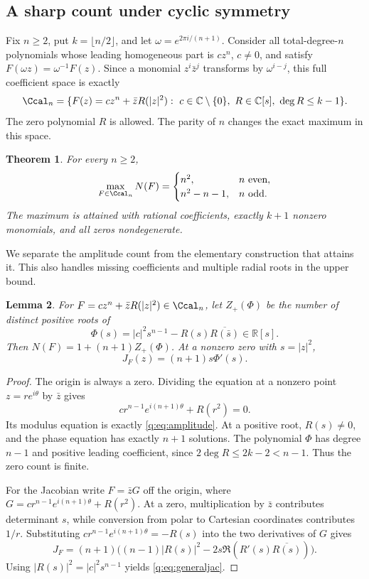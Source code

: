 \documentclass[UTF8,11pt]{ctexart}
\newtheorem{thm}{Theorem}[section]
\newtheorem{lem}[thm]{Lemma}
\theoremstyle{definition}
\numberwithin{equation}{section}
\newcommand{\C}{\mathbb C}\newcommand{\R}{\mathbb R}
\begin{document}
\subsection{A sharp count under cyclic symmetry}\label{q:sec:cyclic}
Fix $n\ge2$, put $k=\lfloor n/2\rfloor$, and let
$\omega=e^{2\pi i/(n+1)}$. Consider all total-degree-$n$ polynomials
whose leading homogeneous part is $cz^n$, $c\ne0$, and satisfy
$F(\omega z)=\omega^{-1}F(z)$. Since a monomial $z^i\bar z^j$ transforms
by $\omega^{i-j}$, this full coefficient space is exactly
\[
 \Ccal_n=\{F(z)=cz^n+\bar z R(|z|^2):\ c\in\C\setminus\{0\},\
                    R\in\C[s],\ \deg R\le k-1\}.
\]
The zero polynomial $R$ is allowed. The parity of $n$ changes the exact
maximum in this space.
\begin{thm}\label{q:thm:cyclic}
For every $n\ge2$,
\begin{equation}\label{q:eq:cyclicmaximum}
 \max_{F\in\Ccal_n}N(F)=
 \begin{cases}
 n^2,&n\text{ even},\\
 n^2-n-1,&n\text{ odd}.
 \end{cases}
\end{equation}
The maximum is attained with rational coefficients, exactly $k+1$
nonzero monomials, and all zeros nondegenerate.
\end{thm}

We separate the amplitude count from the elementary construction that
attains it. This also handles missing coefficients and multiple radial
roots in the upper bound.
\begin{lem}\label{q:lem:amplitude}
For $F=cz^n+\bar zR(|z|^2)\in\Ccal_n$, let $Z_+(\Phi)$ be the number
of distinct positive roots of
\begin{equation}\label{q:eq:amplitude}
 \Phi(s)=|c|^2s^{n-1}-R(s)\overline{R(\bar s)}\in\R[s].
\end{equation}
Then $N(F)=1+(n+1)Z_+(\Phi)$. At a nonzero zero with $s=|z|^2$,
\begin{equation}\label{q:eq:generaljac}
 J_F(z)=(n+1)s\Phi'(s).
\end{equation}
\end{lem}
\begin{proof}
The origin is always a zero. Dividing the equation at a nonzero point
$z=re^{i\theta}$ by $\bar z$ gives
\[
 c r^{n-1}e^{i(n+1)\theta}+R(r^2)=0.
\]
Its modulus equation is exactly \eqref{q:eq:amplitude}. At a positive
root, $R(s)\ne0$, and the phase equation has exactly $n+1$ solutions.
The polynomial $\Phi$ has degree $n-1$ and positive leading coefficient,
since $2\deg R\le2k-2<n-1$. Thus the zero count is finite.

For the Jacobian write $F=\bar zG$ off the origin, where
$G=cr^{n-1}e^{i(n+1)\theta}+R(r^2)$. At a zero, multiplication by
$\bar z$ contributes determinant $s$, while conversion from polar to
Cartesian coordinates contributes $1/r$. Substituting
$cr^{n-1}e^{i(n+1)\theta}=-R(s)$ into the two derivatives of $G$ gives
\[
 J_F=(n+1)\bigl((n-1)|R(s)|^2-2s\Re(R'(s)\overline{R(s)})\bigr).
\]
Using $|R(s)|^2=|c|^2s^{n-1}$ yields \eqref{q:eq:generaljac}.
\end{proof}
\end{document}
